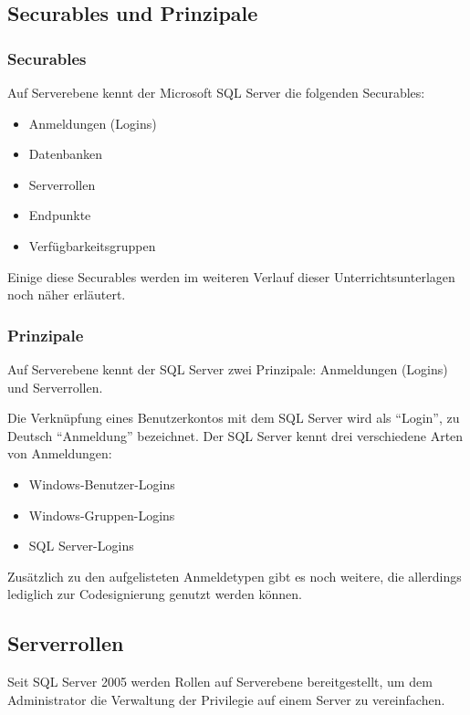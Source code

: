       \subsection{Securables und Prinzipale}
        \subsubsection{Securables}
          Auf Serverebene kennt der Microsoft SQL Server die folgenden
          Securables:
          \begin{itemize}
            \item Anmeldungen (Logins)
            \item Datenbanken
            \item Serverrollen
            \item Endpunkte
            \item Verfügbarkeitsgruppen
          \end{itemize}
          Einige diese Securables werden im weiteren Verlauf dieser
          Unterrichtsunterlagen noch näher erläutert.
          \begin{literaturinternet}
            \item \cite{ms190401}
          \end{literaturinternet}
        \subsubsection{Prinzipale}
          Auf Serverebene kennt der SQL Server zwei Prinzipale: Anmeldungen
          (Logins) und Serverrollen.
          
          Die Verknüpfung eines Benutzerkontos mit dem SQL Server wird als
          \enquote{Login}, zu Deutsch \enquote{Anmeldung} bezeichnet. Der SQL
          Server kennt drei verschiedene Arten von Anmeldungen:
          \begin{itemize}
            \item Windows-Benutzer-Logins
            \item Windows-Gruppen-Logins
            \item SQL Server-Logins
          \end{itemize}
          Zusätzlich zu den aufgelisteten Anmeldetypen gibt es noch weitere, die
          allerdings lediglich zur Codesignierung genutzt werden können.         
      \subsection{Serverrollen}
        Seit SQL Server 2005 werden Rollen auf Serverebene bereitgestellt, um
        dem Administrator die Verwaltung der Privilegie auf einem Server zu
        vereinfachen.
